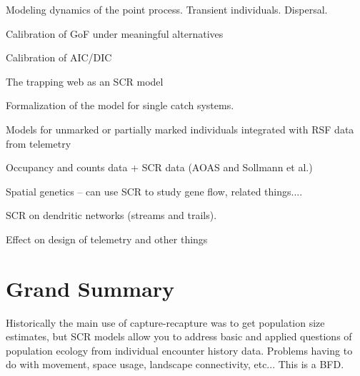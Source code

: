 Modeling dynamics of the point process. Transient individuals. Dispersal. 

Calibration of GoF under meaningful alternatives

Calibration of AIC/DIC 

The trapping web as an SCR model 

Formalization of the model for single catch systems. 

Models for unmarked or partially marked individuals integrated with RSF data from telemetry

Occupancy and counts data + SCR data (AOAS and Sollmann et al.)

Spatial genetics  -- can use SCR to study gene flow, related things....

SCR on dendritic networks (streams and trails).

Effect on design of telemetry and other things



\section{Grand Summary}


Historically the main use of capture-recapture was to get population
size estimates, but 
SCR models allow you to address basic and applied questions of
population ecology from individual encounter history data. Problems
having to do with movement, space usage, landscape connectivity,
etc... This is a BFD. 













